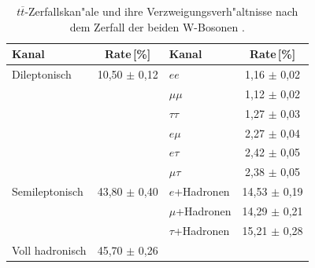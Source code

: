 \begin{table}[ht]
\centering
\begin{tabular}{lc|lc}
Kanal & Rate\,[\%] & Kanal & Rate\,[\%] \\ \hline\hline
Dileptonisch & 10,50 $\pm$ 0,12 & $ee$ & 1,16 $\pm$ 0,02 \\
 &  & $\mu\mu$ & 1,12 $\pm$ 0,02 \\ 
 &  & $\tau\tau$ & 1,27 $\pm$ 0,03 \\
 &  & $e\mu$ & 2,27 $\pm$ 0,04 \\ 
 &  & $e\tau$ & 2,42 $\pm$ 0,05 \\
 &  & $\mu\tau$ & 2,38 $\pm$ 0,05 \\ \hline
Semileptonisch & 43,80 $\pm$ 0,40 & $e$+Hadronen & 14,53 $\pm$ 0,19 \\
 & & $\mu$+Hadronen & 14,29 $\pm$ 0,21 \\
 & & $\tau$+Hadronen & 15,21 $\pm$ 0,28 \\ \hline
Voll hadronisch & 45,70 $\pm$ 0,26 & & \\ \hline
\end{tabular}
	  	\caption{$t\overline{t}$-Zerfallskan"ale und ihre Verzweigungsverh"altnisse nach dem Zerfall der beiden W-Bosonen \cite{pdg}.}
	  		\label{TopZerfallsraten}
\end{table}



